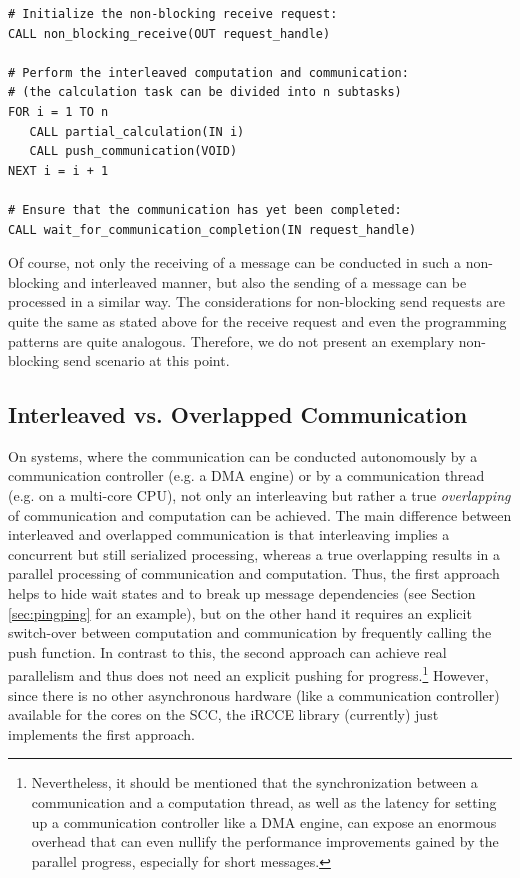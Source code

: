 \documentclass[fontsize=10pt, paper=a4, DIV12, pagesize=auto]{scrartcl}
\begin{document}
\begin{verbatim}
# Initialize the non-blocking receive request:
CALL non_blocking_receive(OUT request_handle)

# Perform the interleaved computation and communication:
# (the calculation task can be divided into n subtasks)
FOR i = 1 TO n
   CALL partial_calculation(IN i)
   CALL push_communication(VOID)
NEXT i = i + 1

# Ensure that the communication has yet been completed:
CALL wait_for_communication_completion(IN request_handle)
\end{verbatim}

Of course, not only the receiving of a message can be conducted in such a non-blocking and interleaved manner, but also the sending of a message can be processed in a similar way.
The considerations for non-blocking send requests are quite the same as stated above for the receive request and even the programming patterns are quite analogous.
Therefore, we do not present an exemplary non-blocking send scenario at this point.


\subsection{Interleaved vs. Overlapped Communication}

On systems, where the communication can be conducted autonomously by a communication controller (e.g. a DMA engine) or by a communication thread (e.g. on a multi-core CPU), not only an interleaving but rather a true \emph{overlapping} of communication and computation can be achieved.
The main difference between interleaved and overlapped communication is that interleaving implies a concurrent but still serialized processing, whereas a true overlapping results in a parallel processing of communication and computation.
Thus, the first approach helps to hide wait states and to break up message dependencies (see Section \ref{sec:pingping} for an example), but on the other hand it requires an explicit switch-over between computation and communication by frequently calling the push function.
In contrast to this, the second approach can achieve real parallelism and thus does not need an explicit pushing for progress.\footnote{Nevertheless, it should be mentioned that the synchronization between a communication and a computation thread, as well as the latency for setting up a communication controller like a DMA engine, can expose an enormous overhead that can even nullify the performance improvements gained by the parallel progress, especially for short messages.}
However, since there is no other asynchronous hardware (like a communication controller) available for the cores on the SCC, the iRCCE library (currently) just implements the first approach.
\end{document}
